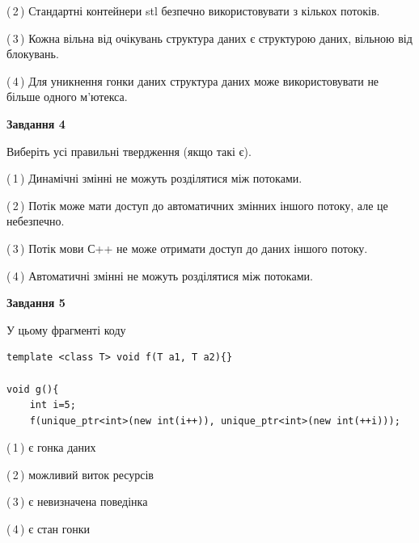 \documentclass[12pt, ukrainian]{article}
\begin{document}
\begin {large}
{(\,2\,) Стандартні контейнери stl безпечно використовувати з кількох потоків.%

(\,3\,) Кожна вільна від очікувань структура даних є структурою даних, вільною від блокувань.%

(\,4\,) Для уникнення гонки даних структура даних може використовувати не більше одного м’ютекса.%



\begin{center}
\textbf{Завдання 4}
\end{center}
Виберіть усі правильні твердження (якщо такі є).\par
\vspace{2mm}

(\,1\,) Динамічні змінні не можуть розділятися між потоками.%

(\,2\,) Потік може мати доступ до автоматичних змінних іншого потоку, але це небезпечно.%

(\,3\,) Потік мови С++ не може отримати доступ до даних іншого потоку.%

(\,4\,) Автоматичні змінні не можуть розділятися між потоками.%



\begin{center}
\textbf{Завдання 5}
\end{center}
У цьому фрагменті коду
\begin{verbatim}
template <class T> void f(T a1, T a2){}

void g(){
    int i=5;
    f(unique_ptr<int>(new int(i++)), unique_ptr<int>(new int(++i)));
\end{verbatim}

(\,1\,) є гонка даних%

(\,2\,) можливий виток ресурсів%

(\,3\,) є невизначена поведінка%

(\,4\,) є стан гонки%


}
\end {large}
\end{document}
